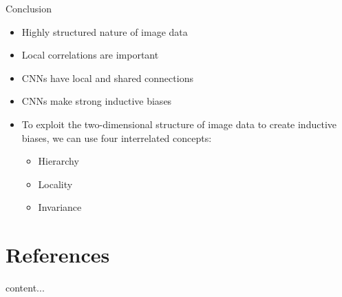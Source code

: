 \documentclass[serif, aspectratio=169]{beamer}
\begin{document}
	
	\begin{frame}{Conclusion}
		
		\begin{itemize}
			\item Highly structured nature of image data
			\item Local correlations are important
			\item CNNs have local and shared connections
			\item CNNs make strong inductive biases
			\item To exploit the two-dimensional structure of image data to create inductive biases, we can use four interrelated concepts:
			\begin{itemize}
				\item Hierarchy
				\item Locality
				\item Invariance 
			\end{itemize}
		\end{itemize}
		
	\end{frame}
	
	\section{References}
	\begin{frame}
		content...
	\end{frame}
\end{document}
